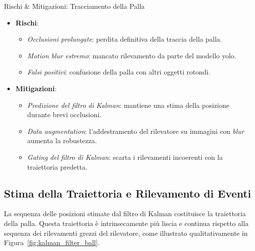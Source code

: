 \documentclass[12pt,a4paper,openright,twoside]{book}
\begin{document}
\begin{riskbox}{Rischi \& Mitigazioni: Tracciamento della Palla}
  \label{box:rischi-mitigazioni-palla}

  \begin{itemize}
    \item \textbf{Rischi}:
      \begin{itemize}
        \item \textit{Occlusioni prolungate}: perdita definitiva della traccia della palla.
        \item \textit{Motion blur estremo}: mancato rilevamento da parte del modello \ac{yolo}.
        \item \textit{Falsi positivi}: confusione della palla con altri oggetti rotondi.
      \end{itemize}
    \item \textbf{Mitigazioni}:
      \begin{itemize}
        \item \textit{Predizione del filtro di Kalman}: mantiene una stima della posizione durante brevi occlusioni.
        \item \textit{Data augmentation}: l'addestramento del rilevatore su immagini con \emph{blur} aumenta la robustezza.
        \item \textit{Gating del filtro di Kalman}: scarta i rilevamenti incoerenti con la traiettoria predetta.
      \end{itemize}
  \end{itemize}
\end{riskbox}

\subsection{Stima della Traiettoria e Rilevamento di Eventi}
\label{sec:stima-traiettoria-eventi}
La sequenza delle posizioni stimate dal filtro di Kalman costituisce la traiettoria della palla. Questa traiettoria è intrinsecamente 
più liscia e continua rispetto alla sequenza dei rilevamenti grezzi del rilevatore, come illustrato qualitativamente in 
Figura~\ref{fig:kalman_filter_ball}.
\end{document}
